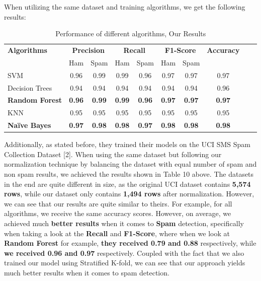 \documentclass{article}
\begin{document}
\noindent
When utilizing the same dataset and training algorithms, we get the following results:

\begin{table}[htbp]
    \centering
    \caption{Performance of different algorithms, Our Results} %
    \label{tab:performance} %
    
    \begin{tabular}{l cccc cccc c}
    \toprule
    \textbf{Algorithms} & \multicolumn{2}{c}{\textbf{Precision}} & \multicolumn{2}{c}{\textbf{Recall}} & \multicolumn{2}{c}{\textbf{F1-Score}} & \textbf{Accuracy} \\
    \cmidrule(lr){2-3} \cmidrule(lr){4-5} \cmidrule(lr){6-7}
    & Ham & Spam & Ham & Spam & Ham & Spam & \\
    \midrule
    SVM & 0.96 & 0.99 & 0.99 & 0.96 & 0.97 & 0.97 & 0.97 \\
    Decision Trees & 0.94 & 0.94 & 0.94 & 0.94 & 0.94 & 0.94 & 0.96 \\
    \textbf{Random Forest} & \textbf{0.96} & \textbf{0.99} & \textbf{0.99} & \textbf{0.96} & \textbf{0.97} & \textbf{0.97} & \textbf{0.97} \\
    KNN & 0.95 & 0.95 & 0.95 & 0.95 & 0.95 & 0.95 & 0.95 \\
    \textbf{Naïve Bayes} & \textbf{0.97} & \textbf{0.98} & \textbf{0.98} & \textbf{0.97} & \textbf{0.98} & \textbf{0.98} & \textbf{0.98} \\
    \bottomrule
    \end{tabular}
\end{table}



\noindent
Additionally, as stated before, they trained their models on the UCI SMS Spam Collection Dataset [2]. When using the same dataset but following our normalization technique by balancing the dataset with equal number of spam and non spam results, we achieved the results shown in Table 10 above. The datasets in the end are quite different in size, as the original UCI dataset contains \textbf{5,574 rows}, while our dataset only contains \textbf{1,494 rows} after normalization. However, we can see that our results are quite similar to theirs. For example, for all algorithms, we receive the same accuracy scores. However, on average, we achieved much \textbf{better results} when it comes to \textbf{Spam} detection, specifically when taking a look at the \textbf{Recall} and \textbf{F1-Score}, where when we look at \textbf{Random Forest} for example, \textbf{they received 0.79 and 0.88} respectively, while \textbf{we received 0.96 and 0.97} respectively. Coupled with the fact that we also trained our model using Stratified K-fold, we can see that our approach yields much better results when it comes to spam detection.
\newline
\end{document}
